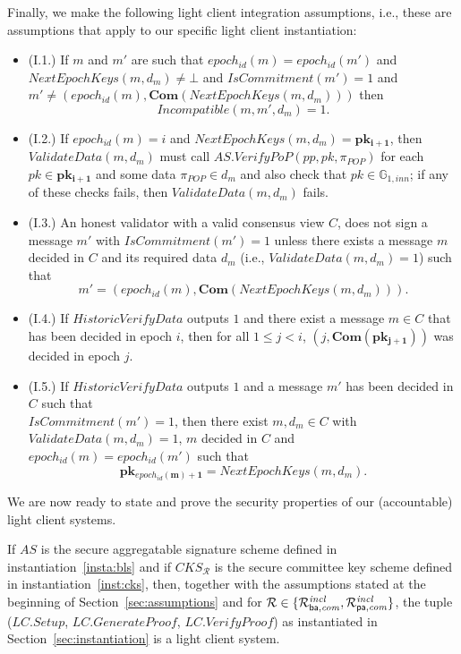 \noindent Finally, we make the following light client integration assumptions, i.e., these are assumptions that 
apply to our specific light client instantiation: 
\begin{itemize}
\item (I.1.) If $m$ and $m'$ are such that 
$\mathit{epoch_{id}}(m) =\mathit{epoch_{id}}(m')$ and 
$\mathit{NextEpochKeys}(m, d_m) \neq \bot$ and 
$\mathit{IsCommitment}(m') = 1$ and 
$m' \neq (\mathit{epoch_{id}}(m), \mathbf{Com}(\mathit{NextEpochKeys}(m, d_m)))$ 
then $$\mathit{Incompatible}(m, m', d_m)=1.$$
\item (I.2.) If $\mathit{epoch_{id}}(m) =i$ and $\mathit{NextEpochKeys}(m, d_m)=\mathbf{pk_{i+1}}$, 
then $\mathit{ValidateData}(m, d_m)$ must call $\mathit{AS.VerifyPoP}(\mathit{pp}, \mathit{pk}, \mathit{\pi_{POP}})$ 
for each $pk \in \mathbf{pk_{i+1}}$ and some data $\mathit{\pi_{POP}} \in d_m$ and also check that
 $\mathit{pk} \in \mathbb{G}_{1,\mathit{inn}}$; if any of these checks fails, then $\mathit{ValidateData}(m, d_m)$ fails.
\item (I.3.) An honest validator with a valid consensus view $C$, does not sign a message $m'$ 
with $\mathit{IsCommitment}(m')=1$ unless there exists a message $m$ decided in $C$ 
and its required data $d_m$ (i.e., $\mathit{ValidateData}(m, d_m) =1$) such that 
$$m'=(\mathit{epoch_{id}}(m), \mathbf{Com}(\mathit{NextEpochKeys}(m, d_m))).$$ 
\item (I.4.) If $\mathit{HistoricVerifyData}$ outputs $1$ and there exist a message $m \in C$ 
that has been decided in epoch $i$, then for all $1 \leq j < i$, $(j, \mathbf{Com}(\mathbf{pk_{j+1}}))$ was decided in epoch $j$. 
\item (I.5.) If $\mathit{HistoricVerifyData}$ outputs $1$ and a message $m'$ has been decided in $C$ 
such that \\ $\mathit{IsCommitment}(m') = 1$, then there exist $m, d_m \in C$ with $\mathit{ValidateData}(m, d_m) = 1$, $m$ decided in $C$
and $\mathit{epoch_{id}}(m) = \mathit{epoch_{id}}(m')$ such that 
$$\mathbf{pk_{\mathit{epoch_{id}}(m)+1}} = \mathit{NextEpochKeys}(m, d_m).$$
\end{itemize}

\noindent We are now ready to state and prove the security properties of our (accountable) light client systems. 

\begin{theorem}
\label{th:soundness} 
If $\mathit{AS}$ is the secure aggregatable signature scheme defined in instantiation~\ref{insta:bls} and if 
$\mathit{CKS_{\mathcal{R}}}$ is the secure committee key scheme defined in instantiation~\ref{inst:cks}, then, together with 
the assumptions stated at the beginning of Section~\ref{sec:assumptions} and for $\mathcal{R} \in \{ \mathcal{R}^{\mathit{incl}}_{\mathsf{ba},\mathit{com}}, \mathcal{R}^{\mathit{incl}}_{\mathsf{pa},\mathit{com}} \}$, the tuple 
($\mathit{LC.Setup}$, $\mathit{LC.GenerateProof}$, $\mathit{LC.VerifyProof}$) as instantiated in Section~\ref{sec:instantiation} is a light client system.
\end{theorem}



